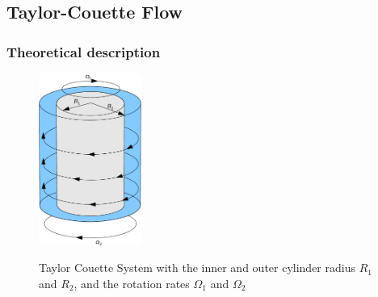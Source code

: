 \subsection{Taylor-Couette Flow}

\subsubsection{Theoretical description}
\begin{figure}[!b]
  \centering
  \includegraphics[width=0.3\textwidth]{gfx/immersed_boundary/tcflow/tcsystem.pdf}\label{fig:tcflow_system}
  \caption{Taylor Couette System with the inner and outer cylinder radius $R_1$ and $R_2$, and the rotation rates $\Omega_1$ and $\Omega_2$}
\end{figure}

